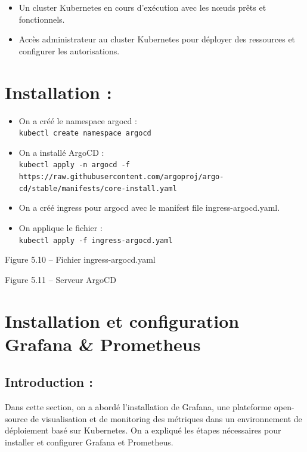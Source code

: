 \begin{itemize}
\item Un cluster Kubernetes en cours d’exécution avec les nœuds prêts et fonctionnels.
\item Accès administrateur au cluster Kubernetes pour déployer des ressources et configurer les autorisations.
\end{itemize}

\section*{Installation :}

\begin{itemize}

\item On a créé le namespace argocd : \\
\texttt{kubectl create namespace argocd}

\item On a installé ArgoCD : \\
\texttt{kubectl apply -n argocd -f https://raw.githubusercontent.com/argoproj/argo-cd/stable/manifests/core-install.yaml}

\item On a créé ingress pour argocd avec le manifest file ingress-argocd.yaml.

\item On applique le fichier : \\
\texttt{kubectl apply -f ingress-argocd.yaml}

\end{itemize}

\begin{center}
Figure 5.10 – Fichier ingress-argocd.yaml
\end{center}
\begin{center}
Figure 5.11 – Serveur ArgoCD
\end{center}

\section*{Installation et configuration Grafana \& Prometheus}

\subsection*{Introduction :}

Dans cette section, on a abordé l’installation de Grafana, une plateforme open-source de visualisation et de monitoring des métriques dans un environnement de déploiement basé sur Kubernetes. On a expliqué les étapes nécessaires pour installer et configurer Grafana et Prometheus.

